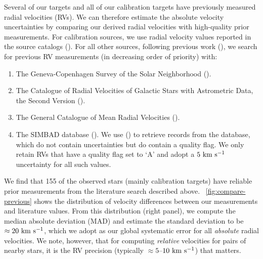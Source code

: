 \documentclass[modern, letterpaper]{aastex61}
\begin{document}
Several of our targets and all of our calibration targets have previously
measured radial velocities (RVs).
We can therefore estimate the absolute velocity uncertainties by comparing our
derived radial velocities with high-quality prior measurements.
For calibration sources, we use radial velocity values reported in the source
catalogs (\citealt{Bensby:2014,Pinsonneault:2014}).
For all other sources, following previous work (\citealt{Shaya:2011}), we search
for previous RV measurements (in decreasing order of priority) with:
\begin{enumerate}
  \item The Geneva-Copenhagen Survey of the Solar Neighborhood
  (\citealt{Nordstrom:2004}).
  \item The Catalogue of Radial Velocities of Galactic Stars with Astrometric
  Data, the Second Version (\citealt{Kharchenko:2007}).
  \item The General Catalogue of Mean Radial Velocities
  (\citealt{Barbier-Brossat:2000}).
  \item The SIMBAD database (\citealt{Wenger:2000}). We use 
  (\citealt{Ginsburg:2016}) to retrieve records from the database, which do not
  contain uncertainties but do contain a quality flag. We only retain RVs that
  have a quality flag set to `A' and adopt a $5~\mathrm{km}~\mathrm{s}^{-1}$ uncertainty for all such
  values.
\end{enumerate}
We find that 155 of the observed stars (mainly calibration targets) have
reliable prior measurements from the literature search described above.
\figurename~\ref{fig:compare-previous} shows the distribution of velocity
differences between our measurements and literature values.
From this distribution (right panel), we compute the median absolute deviation
(MAD) and estimate the standard deviation to be $\approx 20~\mathrm{km}~\mathrm{s}^{-1}$, which we
adopt as our global systematic error for all \emph{absolute} radial velocities.
We note, however, that for computing \emph{relative} velocities for pairs of
nearby stars, it is the RV precision (typically $\approx 5$--$10~\mathrm{km}~\mathrm{s}^{-1}$) that
matters.
\end{document}
